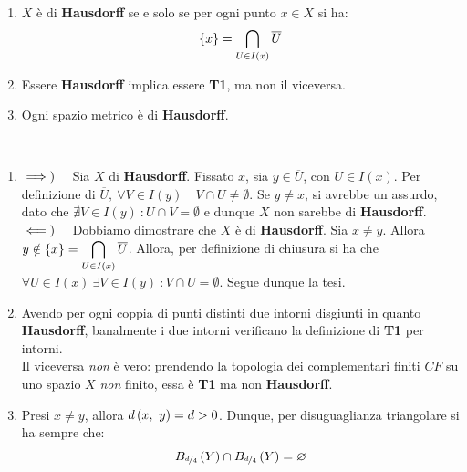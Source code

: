 \begin{observes}~{}
	\begin{enumerate}
		\item $X$ è di \textbf{Hausdorff} se e solo se per ogni punto $x\in X$ si ha:
		\begin{equation}
			\left\{x\right\}=\inter_{U\in I\left(x\right)}\overline{U}
		\end{equation}
	\item Essere \textbf{Hausdorff} implica essere \textbf{T1}, ma non il viceversa.
		\item Ogni spazio metrico è di \textbf{Hausdorff}.
	\end{enumerate}
\vspace{-3mm}
\end{observes}
\begin{demonstration}~{}
\begin{enumerate}[label=\Roman*]
\item $\impliesdx$ Sia $X$ di \textbf{Hausdorff}. Fissato $x$, sia $y\in\overline{U}$, con $U\in I\left(x\right)$. Per definizione di $\overline{U},\ \forall V\in I\left(y\right)\quad V\cap U\neq\emptyset$. Se $y \neq x$, si avrebbe un assurdo, dato che $\nexists V\in I\left(y\right)\ \colon U\cap V=\emptyset$ e dunque $X$ non sarebbe di \textbf{Hausdorff}.\\
$\impliessx$ Dobbiamo dimostrare che $X$ è di \textbf{Hausdorff}. Sia $x\neq y$. Allora $\displaystyle y\notin\left\{x\right\}=\inter_{U\in I\left(x\right)}\overline{U}$. Allora, per definizione di chiusura si ha che $\forall U\in I\left(x\right)\ \exists V\in I\left(y\right)\ \colon V\cap U=\emptyset$. Segue dunque la tesi.
\item Avendo per ogni coppia di punti distinti due intorni disgiunti in quanto \textbf{Hausdorff}, banalmente i due intorni verificano la definizione di \textbf{T1} per intorni.\\
Il viceversa \textit{non} è vero: prendendo la topologia dei complementari finiti $CF$ su uno spazio $X$ \textit{non} finito, essa è \textbf{T1} ma non \textbf{Hausdorff}.
\item Presi $x\neq y$, allora $\mvf{d}{x}{y}=d>0$. Dunque, per disuguaglianza triangolare si ha sempre che:
\begin{equation*}
B_{\nicefrac{d}{4}}\left(Y\right)\cap B_{\nicefrac{d}{4}}\left(Y\right)=\emptyset
\end{equation*}
\end{enumerate}
\vspace{-6mm}
\end{demonstration}
